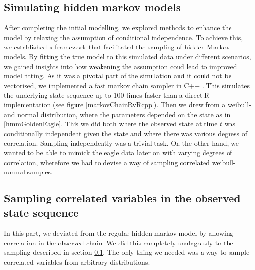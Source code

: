 \subsection{Simulating hidden markov models}\label{simHMM}
After completing the initial modelling, we explored methods to enhance the model by relaxing the assumption of conditional independence. To achieve this, we established a framework that facilitated the sampling of hidden Markov models. By fitting the true model to this simulated data under different scenarios, we gained insights into how weakening the assumption coud lead to improved model fitting. As it was a pivotal part of the simulation and it could not be vectorized, we implemented a fast markov chain sampler in C++ \cite{Rcpp}. This simulates the underlying state sequence up to 100 times faster than a direct R implementation (see figure \ref{markovChainRvRcpp}). Then we drew from a weibull- and normal distribution, where the parameters depended on the state as in \ref{hmmGoldenEagle}. This we did both where the observed state at time $t$ was conditionally independent given the state and where there was various degress of correlation. Sampling independently was a trivial task. On the other hand, we wanted to be able to mimick the eagle data later on with varying degrees of correlation, wherefore we had to devise a way of sampling correlated weibull-normal samples. 
\subsection{Sampling correlated variables in the observed state sequence}\label{correlatedVariables}
In this part, we deviated from the regular hidden markov model by allowing correlation in the observed chain. We did this completely analagously to the sampling described in section \ref{simHMM}. The only thing we needed was a way to sample correlated variables from arbitrary distributions.
